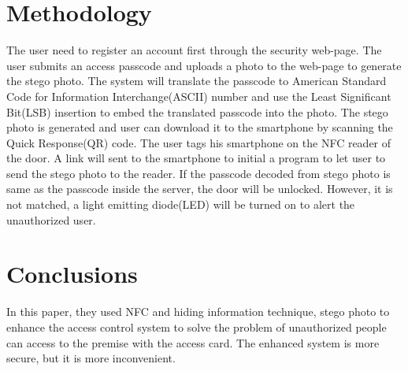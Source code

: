 \documentclass[•]{article}
\begin{document}
\section{Methodology}
The user need to register an account first through the security web-page. The user submits an access passcode and uploads a photo to the web-page to generate the stego photo. The system will translate the passcode to American Standard Code for Information Interchange(ASCII) number and use the Least Significant Bit(LSB) insertion to embed the translated passcode into the photo. The stego photo is generated and user can download it to the smartphone by scanning the Quick Response(QR) code.
The user tags his smartphone on the NFC reader of the door. A link will sent to the smartphone to initial a program to let user to send the stego photo to the reader.
If the passcode decoded from stego photo is same as the passcode inside the server, the door will be unlocked. However, it is not matched, a light emitting diode(LED) will be turned on to alert the unauthorized user.

\section{Conclusions}
In this paper, they used NFC and hiding information technique, stego photo to enhance the access control system to solve the problem of unauthorized people can access to the premise with the access card. The enhanced system is more secure, but it is more inconvenient. 


{}
\end{document}
